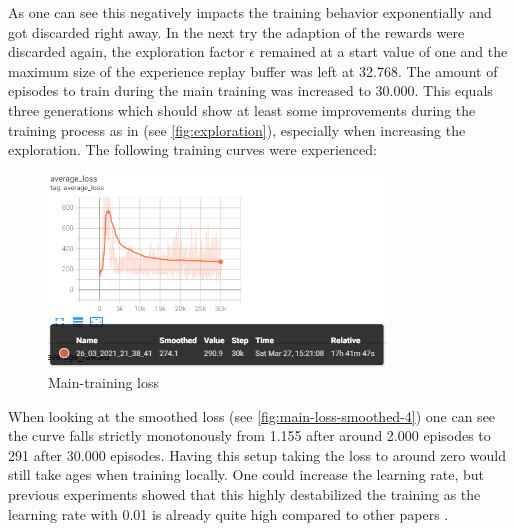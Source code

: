 As one can see this negatively impacts the training behavior exponentially and got discarded right away. In the next try the adaption of the rewards were discarded again, the exploration factor $\epsilon$ remained at a start value of one and the maximum size of the experience replay buffer was left at 32.768. The amount of episodes to train during the main training was increased to 30.000. This equals three generations which should show at least some improvements during the training process as in \cite{Kormelink2018} (see \autoref{fig:exploration}), especially when increasing the exploration. The following training curves were experienced: 

\begin{figure}[ht]
	\centering
	\includegraphics[width=0.8\textwidth]{figures/training4-main-loss-smooth.PNG}
	\caption{Main-training loss}
	\label{fig:main-loss-smoothed-4}
\end{figure}

When looking at the smoothed loss (see \autoref{fig:main-loss-smoothed-4}) one can see the curve falls strictly monotonously from 1.155 after around 2.000 episodes to 291 after 30.000 episodes. Having this setup taking the loss to around zero would still take ages when training locally. One could increase the learning rate, but previous experiments showed that this highly destabilized the training as the learning rate with 0.01 is already quite high compared to other papers \cite{Franca2019, Kormelink2018}. 

